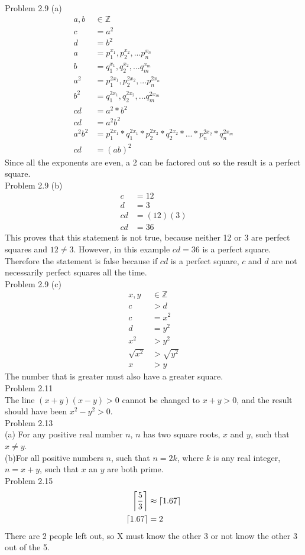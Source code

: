 \documentclass{article}
\DeclarePairedDelimiter{\ceil}{\lceil}{\rceil}
\begin{document}
Problem 2.9 (a)
\begin{align*}
  a, b &\in \mathbb{Z}\\
  c &= a^2\\
  d &= b^2\\
  a &= p_1^{x_1}, p_2^{x_2}, ... p_n^{x_n}\\
  b &= q_1^{x_1}, q_2^{x_2}, ... q_m^{x_m}\\
  a^2 &= p_1^{2x_1}, p_2^{2x_2}, ... p_n^{2x_n}\\
  b^2 &= q_1^{2x_1}, q_2^{2x_2}, ... q_m^{2x_m}\\
  cd &= a^2 * b^2\\
  cd &= a^2b^2\\
  a^2b^2 &= p_1^{2x_1} * q_1^{2x_1} * p_2^{2x_2} * q_2^{2x_2} * ... * p_n^{2x_2} * q_n^{2x_m}\\
  cd &= (ab)^2
\end{align*}
Since all the exponents are even, a 2 can be factored out so the result is a perfect square.\\

Problem 2.9 (b)
\begin{align*}
  c &= 12\\
  d &= 3\\
  cd &= (12)(3)\\
  cd &= 36
\end{align*}
This proves that this statement is not true, because neither 12 or 3 are perfect squares and $12 \neq 3$. However, in this example $cd = 36$ is a perfect square. Therefore the statement is false because if $cd$ is a perfect square, $c$ and $d$ are not necessarily perfect squares all the time.\\

Problem 2.9 (c)
\begin{align*}
  x, y &\in \mathbb{Z}\\
  c &> d\\
  c &= x^2\\
  d &= y^2\\
  x^2 &> y^2\\
  \sqrt{x^2} &> \sqrt{y^2}\\
  x &> y
\end{align*}
The number that is greater must also have a greater square.\\

Problem 2.11\\
The line $(x+y)(x-y) > 0 $ cannot be changed to $x+y > 0$, and the result should have been $x^2-y^2 > 0$.\\

Problem 2.13\\
(a) For any positive real number $n$, $n$ has two square roots, $x$ and $y$, such that $x \neq y$.\\
(b)For all positive numbers $n$, such that $n = 2k$, where $k$ is any real integer, $n=x+y$, such that $x$ an $y$ are both prime.\\

Problem 2.15\\
\begin{align*}
  \ceil*{\frac{5}{3}} &\approx \ceil*{1.67}\\
  \ceil*{1.67} &= 2
\end{align*}
There are 2 people left out, so X must know the other 3 or not know the other 3 out of the 5.
\end{document}
